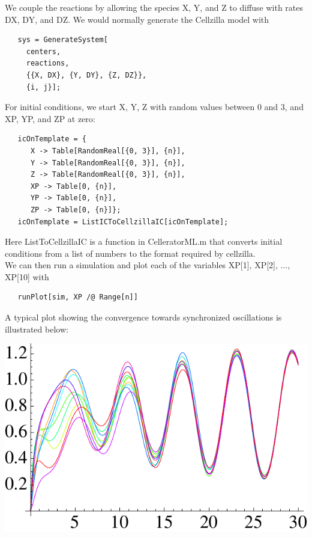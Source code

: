 \documentclass[12pt,letterpaper]{article}
\begin{document}
We couple the reactions by allowing the species X, Y, and Z to diffuse with rates DX, DY, and DZ. 
We would normally generate the Cellzilla model with

\begin{verbatim}
   sys = GenerateSystem[
     centers, 
     reactions, 
     {{X, DX}, {Y, DY}, {Z, DZ}}, 
     {i, j}];
\end{verbatim}

For initial conditions, we start X, Y, Z with random values between 0 and 3, and XP, YP, and ZP at zero:

\begin{verbatim}
   icOnTemplate = {
      X -> Table[RandomReal[{0, 3}], {n}], 
      Y -> Table[RandomReal[{0, 3}], {n}], 
      Z -> Table[RandomReal[{0, 3}], {n}], 
      XP -> Table[0, {n}], 
      YP -> Table[0, {n}], 
      ZP -> Table[0, {n}]};
   icOnTemplate = ListICToCellzillaIC[icOnTemplate];
\end{verbatim}

Here {\ttfamily ListToCellzillaIC} is a function in CelleratorML.m that converts initial conditions from 
a list of numbers to the format required by cellzilla.\\

We can then run a simulation and plot each of the variables {\ttfamily XP[1], XP[2], ..., XP[10]} with

\begin{verbatim}
   runPlot[sim, XP /@ Range[n]]
\end{verbatim}

A typical plot showing the convergence towards synchronized oscillations is illustrated below: 
\begin{center}
\includegraphics[scale=0.7]{ringsync.pdf}
\end{center}
\end{document}

